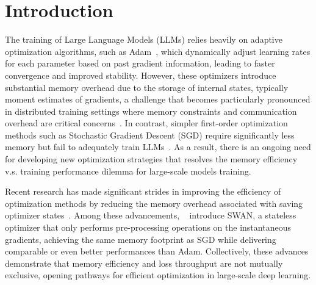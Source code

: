 \section{Introduction}

The training of Large Language Models (LLMs) relies heavily  on adaptive optimization algorithms, such as Adam~\cite{adam}, which dynamically adjust learning rates for each parameter based on past gradient information, leading to faster convergence and improved stability. However, these optimizers introduce substantial memory overhead due to the storage of internal states, typically moment estimates of gradients, a challenge that becomes particularly pronounced in distributed training settings where memory constraints and communication overhead are critical concerns~\cite{rajbhandari2020zero, korthikanti2023reducing, llama3}. In contrast, simpler first-order optimization methods such as Stochastic Gradient Descent (SGD) require significantly less memory but fail to adequately train LLMs~\cite{zhao2024deconstructing, zhang2020adaptive, kunstner2023noise, kunstner2024heavy}. As a result, there is an ongoing need for developing new optimization strategies that resolves the memory efficiency v.s. training performance dilemma for large-scale models training.



Recent research has made significant strides in improving the efficiency of optimization methods by reducing the memory overhead associated with saving optimizer states~\cite{hu2021lora,Lialin2023ReLoRAHT, Zhao2024GaLoreML, Hao2024FloraLA, xu2024adamlearningratescaling, jordan2024muon, zhang2024adam, ma2024swansgdnormalizationwhitening, zhu2024apollo}. Among these advancements,  ~\citet{ma2024swansgdnormalizationwhitening} introduce SWAN, a stateless optimizer that only performs pre-processing operations on the instantaneous gradients, achieving the same memory footprint as SGD while delivering comparable or even better performances than Adam. Collectively, these advances demonstrate that memory efficiency and loss throughput are not mutually exclusive, opening pathways for efficient optimization in large-scale deep learning.






